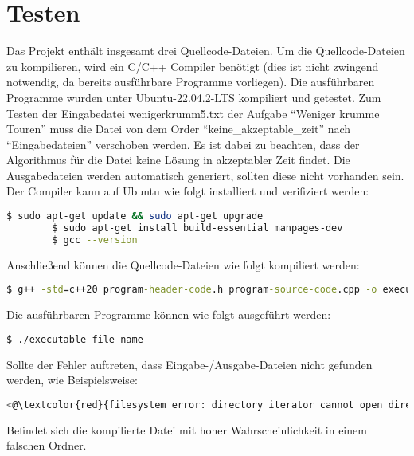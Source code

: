 \documentclass[a4paper,10pt,ngerman]{scrartcl}
\begin{document}
    \section{Testen}\label{sec:testen}
    Das Projekt enthält insgesamt drei Quellcode-Dateien.
    Um die Quellcode-Dateien zu kompilieren, wird ein C/C++ Compiler benötigt
    (dies ist nicht zwingend notwendig, da bereits ausführbare Programme vorliegen).
    Die ausführbaren Programme wurden unter Ubuntu-22.04.2-LTS kompiliert und getestet.
    Zum Testen der Eingabedatei wenigerkrumm5.txt der Aufgabe ``Weniger krumme Touren''
    muss die Datei von dem Order ``keine\_akzeptable\_zeit'' nach ``Eingabedateien'' verschoben werden.
    Es ist dabei zu beachten, dass der Algorithmus für die Datei keine Lösung in akzeptabler Zeit findet.
    Die Ausgabedateien werden automatisch generiert, sollten diese nicht vorhanden sein.
    Der Compiler kann auf Ubuntu wie folgt installiert und verifiziert werden:
    \begin{lstlisting}[language=bash,label={lst:install}]
        $ sudo apt-get update && sudo apt-get upgrade
        $ sudo apt-get install build-essential manpages-dev
        $ gcc --version
    \end{lstlisting}
    Anschließend können die Quellcode-Dateien wie folgt kompiliert werden:
    \begin{lstlisting}[language=cmd,label={lst:compile}]
        $ g++ -std=c++20 program-header-code.h program-source-code.cpp -o executable-file-name
    \end{lstlisting}
    Die ausführbaren Programme können wie folgt ausgeführt werden:
    \begin{lstlisting}[language=bash,label={lst:run}]
        $ ./executable-file-name
    \end{lstlisting}
    Sollte der Fehler auftreten, dass Eingabe-/Ausgabe-Dateien nicht gefunden werden,
    wie Beispielsweise:
    \begin{lstlisting}[language=bash,label={lst:error},color=blue]
       <@\textcolor{red}{filesystem error: directory iterator cannot open directory: No such file or directory}@>
    \end{lstlisting}
    Befindet sich die kompilierte Datei mit hoher Wahrscheinlichkeit in einem falschen Ordner.
\end{document}
